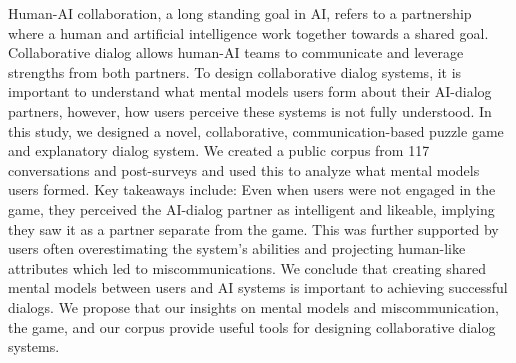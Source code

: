 Human-AI collaboration, a long standing goal in AI, refers to a partnership where a human and artificial intelligence work together towards a shared goal. Collaborative dialog allows human-AI teams to communicate and leverage strengths from both partners. To design collaborative dialog systems, it is important to understand what mental models users form about their AI-dialog partners, however, how users perceive these systems is not fully understood. In this study, we designed a novel, collaborative, communication-based puzzle game and explanatory dialog system. We created a public    corpus from 117 conversations and post-surveys and used this to analyze what mental models users formed. Key takeaways include: Even when users were not engaged in the game, they perceived the AI-dialog partner as intelligent and likeable, implying they saw it as a partner separate from the game. This was further supported by users often overestimating the system's abilities and projecting human-like attributes which led to miscommunications. We conclude that creating shared mental models between users and AI systems is important to achieving successful dialogs. We propose that our insights on mental models and miscommunication, the game, and our corpus provide useful tools for designing collaborative dialog systems.
